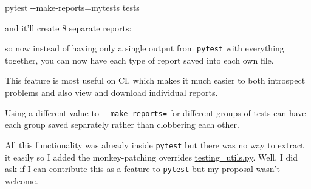 \documentclass[
]{report}
\newenvironment{Shaded}{\begin{snugshade}}{\end{snugshade}}
\newcommand{\AttributeTok}[1]{\textcolor[rgb]{0.40,0.45,0.13}{#1}}
\newcommand{\ExtensionTok}[1]{\textcolor[rgb]{0.00,0.23,0.31}{#1}}
\newcommand{\NormalTok}[1]{\textcolor[rgb]{0.00,0.23,0.31}{#1}}
\newcommand{\OperatorTok}[1]{\textcolor[rgb]{0.37,0.37,0.37}{#1}}
\begin{document}
\begin{Shaded}
\begin{Highlighting}[]
\ExtensionTok{pytest} \AttributeTok{{-}{-}make{-}reports}\OperatorTok{=}\NormalTok{mytests tests}
\end{Highlighting}
\end{Shaded}

and it'll create 8 separate reports:

\begin{Shaded}
\end{Shaded}

so now instead of having only a single output from \texttt{pytest} with
everything together, you can now have each type of report saved into
each own file.

This feature is most useful on CI, which makes it much easier to both
introspect problems and also view and download individual reports.

Using a different value to \texttt{-\/-make-reports=} for different
groups of tests can have each group saved separately rather than
clobbering each other.

All this functionality was already inside \texttt{pytest} but there was
no way to extract it easily so I added the monkey-patching overrides
\url{testing_utils.py}. Well, I did ask if I can contribute this as a
feature to \texttt{pytest} but my proposal wasn't welcome.
\end{document}
